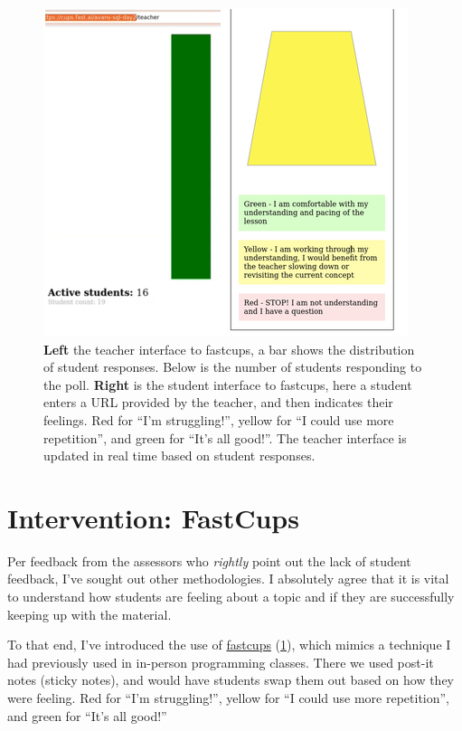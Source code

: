 \documentclass[paper=a4,justified,a4paper]{tufte-handout}
\begin{document}
\begin{figure}
\centering
\includegraphics{both.png}
\caption{\textbf{Left} the teacher interface to fastcups, a bar shows
the distribution of student responses. Below is the number of students
responding to the poll. \textbf{Right} is the student interface to
fastcups, here a student enters a URL provided by the teacher, and then
indicates their feelings. Red for ``I'm struggling!'', yellow for ``I
could use more repetition'', and green for ``It's all good!''. The
teacher interface is updated in real time based on student
responses.\label{fig1}}
\end{figure}

\hypertarget{intervention-fastcups}{%
\section{Intervention: FastCups}\label{intervention-fastcups}}

Per feedback from the assessors who \emph{rightly} point out the lack of
student feedback, I've sought out other methodologies. I absolutely
agree that it is vital to understand how students are feeling about a
topic and if they are successfully keeping up with the material.

To that end, I've introduced the use of
\href{http://cups.fast.ai/}{fastcups} (\cref{fig1}), which mimics a
technique I had previously used in in-person programming classes. There
we used post-it notes (sticky notes), and would have students swap them
out based on how they were feeling. Red for ``I'm struggling!'', yellow
for ``I could use more repetition'', and green for ``It's all good!''
\end{document}

